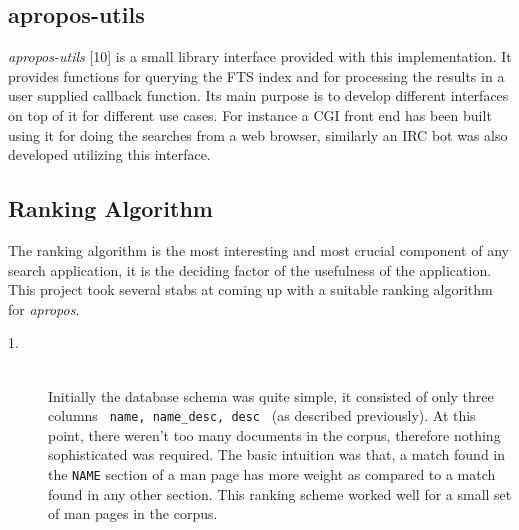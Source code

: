 \documentclass[letterpaper,twocolumn,10pt]{article}
\begin{document}
\subsection{apropos-utils}
\textit{apropos-utils} [10] is a small library interface provided with this
implementation. It provides functions for querying the FTS index and for
processing the results in a user supplied callback function. Its main purpose
is to develop different interfaces on top of it for different
use cases. For instance a CGI front end has been built using it for doing
the searches from a web browser, similarly an IRC bot was also developed utilizing this interface.

\subsection{Ranking Algorithm}
The ranking algorithm is the most interesting and most crucial component of
any search application, it is the deciding factor of the usefulness of the
application. This project took several stabs at coming up with a suitable ranking
algorithm for \textit{apropos}.

\begin{description}
\item[1.] \hfill \\
Initially the database schema was quite simple, it consisted of only three
columns
{\tt 
name, name\_desc, desc
}
(as described previously). At this point, there weren't too many documents in
the corpus, therefore nothing sophisticated was required. The basic intuition was
that, a match found in the
{\tt NAME} section of a man page has more weight as compared to a match found
in any other section. This ranking scheme worked well for a small set of man
pages in the corpus.
\end{description}
\end{document}
